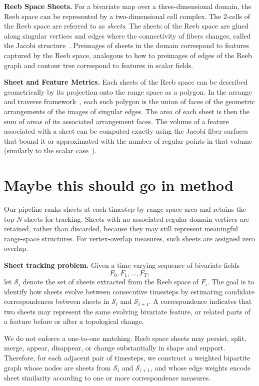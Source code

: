 \documentclass{vgtc}                          %
\newcommand{\Sheets}{\mathcal{S}}
\newcommand{\myparagraph}[1]{\vspace{1mm} \noindent \textbf{#1}}
\begin{document}
\myparagraph{Reeb Space Sheets.} 
For a bivariate map over a three-dimensional domain, the Reeb space can be represented by a two-dimensional cell complex. 
The 2-cells of the Reeb space are referred to as \textit{sheets}.
The sheets of the Reeb space are glued along singular vertices and edges where the connectivity of fibers changes, called the Jacobi structure~\cite{Chattopadhyay2014}.
Preimages of sheets in the domain correspond to features captured by the Reeb space, analogous to how to preimages of edges of the Reeb graph and contour tree correspond to features in scalar fields.

\myparagraph{Sheet and Feature Metrics.}
Each sheets of the Reeb space can be described geometrically by its projection onto the range space as a polygon.
In the arrange and traverse framework~\cite{hristov2025, Hristov2026SingularAA}, each such polygon is the union of faces of the geometric arrangements of the images of singular edges.
The area of each sheet is then the sum of areas of its associated arrangement faces.
The volume of a feature associated with a sheet can be computed exactly using the Jacobi fiber surfaces that bound it or approximated with the number of regular points in that volume (similarly to the scalar case~\cite{Schneider2008}).

\section{Maybe this should go in method}

Our pipeline ranks sheets at each timestep by range-space area and retains the top $N$ sheets for tracking. Sheets with no associated regular domain vertices are retained, rather than discarded, because they may still represent meaningful range-space structures. For vertex-overlap measures, such sheets are assigned zero overlap.

\myparagraph{Sheet tracking problem.} Given a time varying sequence of bivariate fields
\[
F_0,F_1,\ldots,F_T,
\]
let $\Sheets_i$ denote the set of sheets extracted from the Reeb space of $F_i$. The goal is to identify how sheets evolve between consecutive timesteps by estimating candidate correspondences between sheets in $\Sheets_i$ and $\Sheets_{i+1}$. A correspondence indicates that two sheets may represent the same evolving bivariate feature, or related parts of a feature before or after a topological change.

We do not enforce a one-to-one matching. Reeb space sheets may persist, split, merge, appear, disappear, or change substantially in shape and support. Therefore, for each adjacent pair of timesteps, we construct a weighted bipartite graph whose nodes are sheets from $\Sheets_i$ and $\Sheets_{i+1}$, and whose edge weights encode sheet similarity according to one or more correspondence measures.
\end{document}
